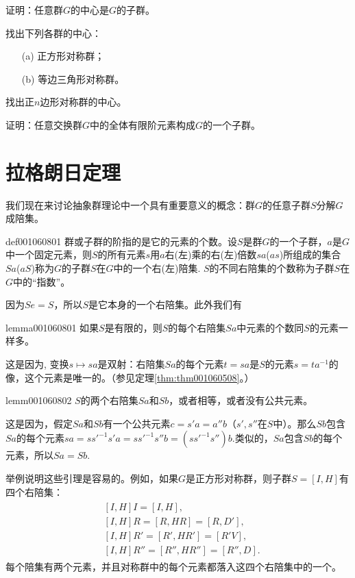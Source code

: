 \begin{problemset}
\item 证明：任意群$G$的中心是$G$的子群。

\item 找出下列各群的中心：
\begin{enumerate}
\item[(a)] 正方形对称群；
\item[(b)] 等边三角形对称群。
\end{enumerate}

\item 找出正$n$边形对称群的中心。

\item 证明：任意交换群$G$中的全体有限阶元素构成$G$的一个子群。

\end{problemset}



\section{拉格朗日定理}\label{section0010608}
我们现在来讨论抽象群理论中一个具有重要意义的概念：群$G$的任意子群$S$分解$G$成陪集。

\begin{definition}{}{def001060801}
群或子群的阶指的是它的元素的个数。设$S$是群$G$的一个子群，$a$是$G$中一个固定元素，则$S$的所有元素$s$用$a$右(左)乘的右(左)倍数$sa$($as$)所组成的集合$Sa$($aS$)称为$G$的子群$S$在$G$中的一个右(左)陪集. $S$的不同右陪集的个数称为子群$S$在$G$中的“指数”。
\end{definition}

因为$Se=S$，所以$S$是它本身的一个右陪集。此外我们有
\begin{lemma}{}{lemma001060801}
如果$S$是有限的，则$S$的每个右陪集$Sa$中元素的个数同$S$的元素一样多。
\end{lemma}

这是因为, 变换$s \mapsto sa$是双射：右陪集$Sa$的每个元素$t=sa$是$S$的元素$s=ta^{-1}$的像，这个元素是唯一的。（参见定理\ref{thm:thm001060508}。）

\begin{lemma}{}{lemm001060802}
$S$的两个右陪集$Sa$和$Sb$，或者相等，或者没有公共元素。
\end{lemma}

这是因为，假定$Sa$和$Sb$有一个公共元素$c = s'a = a''b$（$s', s''$在$S$中）。那么$Sb$包含$Sa$的每个元素$sa = ss'^{-1}s'a = ss'^{-1}s''b = (ss'^{-1}s'')b$.类似的，$Sa$包含$Sb$的每个元素，所以$Sa=Sb$.

举例说明这些引理是容易的。例如，如果$G$是正方形对称群，则子群$S=[I,H]$有四个右陪集：
\begin{gather*}
\begin{aligned}
&[I, H]I = [I, H],\\
&[I, H]R = [R, HR] = [R, D'],\\
&[I, H]R' = [R', HR'] = [R' V],\\
&[I, H]R'' = [R'', HR''] = [R'', D].
\end{aligned}
\end{gather*}
每个陪集有两个元素，并且对称群中的每个元素都落入这四个右陪集中的一个。

